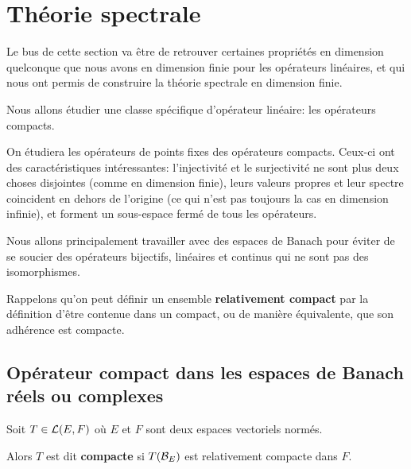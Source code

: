 \section{Théorie spectrale}

Le bus de cette section va être de retrouver certaines propriétés en dimension
quelconque que nous avons en dimension finie pour les opérateurs linéaires, et
qui nous ont permis de construire la théorie spectrale en dimension finie.

Nous allons étudier une classe spécifique d'opérateur linéaire: les opérateurs
compacts.

On étudiera les opérateurs de points fixes des opérateurs compacts. Ceux-ci ont
des caractéristiques intéressantes: l'injectivité et le surjectivité ne sont
plus deux choses disjointes (comme en dimension finie), leurs valeurs propres et
leur spectre coincident en dehors de l'origine (ce qui n'est pas toujours la cas
en dimension infinie), et forment un sous-espace fermé de tous les opérateurs.

Nous allons principalement travailler avec des espaces de Banach pour éviter de
se soucier des opérateurs bijectifs, linéaires et continus qui ne sont pas des
isomorphismes.




Rappelons qu'on peut définir un ensemble \textbf{relativement compact} par la
définition d'être contenue dans un compact, ou de manière équivalente, que son
adhérence est compacte.

\subsection{Opérateur compact dans les espaces de Banach réels ou complexes}

\begin{definition}
	Soit $T \in \mathcal{L}(E, F)$ où $E$ et $F$ sont deux espaces
	vectoriels normés.

	Alors $T$ est dit \textbf{compacte} si $T(\mathcal{B}_{E})$ est relativement compacte
	dans $F$.
\end{definition}

